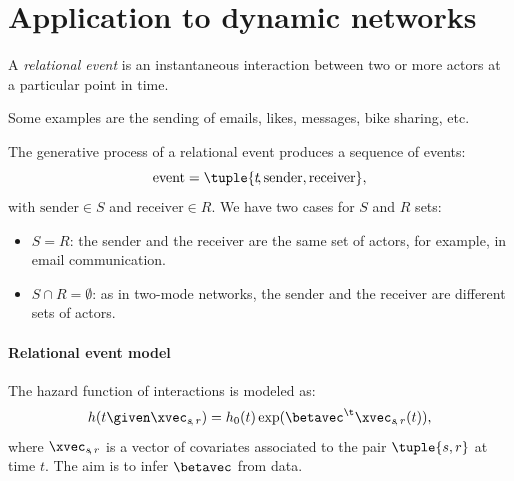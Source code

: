 \section{Application to dynamic networks}

\begin{definition*}
    A \emph{relational event} is an instantaneous interaction between two or more actors at a particular point in time.
\end{definition*}

\begin{example}
    Some examples are the sending of emails, likes, messages, bike sharing, etc.
\end{example}

The generative process of a relational event produces a sequence of events:
\begin{equation}
    \text{event} = \tuple{t\negthinspace, \text{sender}, \text{receiver}},
\end{equation}
with $\text{sender} \in S$ and $\text{receiver} \in R$. We have two cases for $S$ and $R$ sets:
\begin{itemize}
    \item $S = R$: the sender and the receiver are the same set of actors, for example, in email communication.
    \item $S \cap R = \emptyset$: as in two-mode networks, the sender and the receiver are different sets of actors.
\end{itemize}

\paragraph{Relational event model}

The hazard function of interactions is modeled as:
\begin{equation}
    h(t \given \xvec_{s\negthinspace,\,r}) = h_0(t) \exp(\betavec^\t\xvec_{s\negthinspace,\,r}(t)),
\end{equation}
where $\xvec_{s\negthinspace,\,r}$ is a vector of covariates associated to the pair $\tuple{s,r}$ at time $t$. The aim is to infer $\betavec$ from data.

